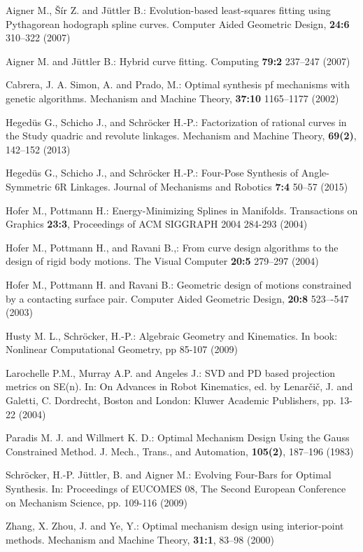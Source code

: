\documentclass{scrartcl}
\begin{document}
\begin{thebibliography}{99.}




 Aigner M., Šír Z. and Jüttler B.: Evolution-based least-squares fitting using Pythagorean hodograph spline curves. Computer Aided Geometric Design, \textbf{24:6} 310--322 (2007)


 Aigner M. and Jüttler B.: Hybrid curve fitting. Computing \textbf{79:2} 237--247 (2007) 


 Cabrera, J. A. Simon, A. and Prado, M.: Optimal synthesis pf mechanisms with genetic algorithms. Mechanism and Machine Theory, \textbf{37:10} 1165--1177 (2002)


 Hegedüs G., Schicho J., and Schröcker H.-P.: Factorization of rational curves in the Study quadric and revolute linkages. Mechanism and Machine Theory, \textbf{69(2)}, 142--152 (2013)


 Hegedüs G., Schicho J., and Schröcker H.-P.: Four-Pose Synthesis of Angle-Symmetric 6R Linkages. Journal of Mechanisms and Robotics \textbf{7:4} 50--57 (2015)


 Hofer M., Pottmann H.: Energy-Minimizing Splines in Manifolds. Transactions on Graphics \textbf{23:3}, Proceedings of ACM SIGGRAPH 2004 284-293 (2004)


 Hofer M., Pottmann H., and Ravani B.,: From curve design algorithms to the design of rigid body motions. The Visual Computer \textbf{20:5} 279--297 (2004)


	Hofer M., Pottmann H. and Ravani B.: Geometric design of motions constrained by a contacting surface pair. Computer Aided Geometric Design, \textbf{20:8} 523–-547 (2003)


 Husty M. L., Schröcker, H.-P.: Algebraic Geometry and Kinematics. In book: Nonlinear Computational Geometry, pp 85-107 (2009)


 Larochelle P.M., Murray A.P. and Angeles J.: SVD and PD based projection metrics on SE(n). In: On Advances in Robot Kinematics, ed. by Lenar{\v c}i{\v c}, J. and Galetti, C. Dordrecht, Boston and London: Kluwer Academic Publishers, pp. 13-22 (2004)


 Paradis M. J. and Willmert K. D.: Optimal Mechanism Design Using the Gauss Constrained Method. J. Mech., Trans., and Automation, \textbf{105(2)}, 187--196 (1983)


 Schröcker, H.-P. Jüttler, B. and Aigner M.: Evolving Four-Bars for Optimal Synthesis. In: Proceedings of EUCOMES 08, The Second European Conference on Mechanism Science, pp. 109-116 (2009)


 Zhang, X. Zhou, J. and Ye, Y.: Optimal mechanism design using interior-point methods. Mechanism and Machine Theory, \textbf{31:1}, 83--98 (2000)



\end{thebibliography}
\end{document}

